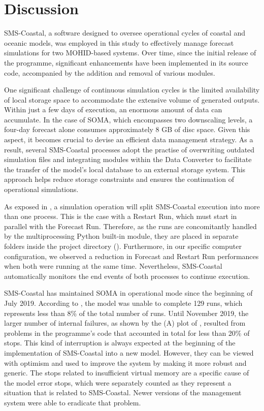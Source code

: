 \section{Discussion} \label{sec:cp4_discuss}
SMS-Coastal, a software designed to oversee operational cycles of coastal and oceanic models, was employed in this study to effectively manage forecast simulations for two MOHID-based systems. Over time, since the initial release of the programme, significant enhancements have been implemented in its source code, accompanied by the addition and removal of various modules.

One significant challenge of continuous simulation cycles is the limited availability of local storage space to accommodate the extensive volume of generated outputs. Within just a few days of execution, an enormous amount of data can accumulate. In the case of SOMA, which encompasses two downscaling levels, a four-day forecast alone consumes approximately 8 GB of disc space. Given this aspect, it becomes crucial to devise an efficient data management strategy. As a result, several SMS-Coastal processes adopt the practise of overwriting outdated simulation files and integrating modules within the Data Converter to facilitate the transfer of the model's local database to an external storage system. This approach helps reduce storage constraints and ensures the continuation of operational simulations.

As exposed in , a simulation operation will split SMS-Coastal execution into more than one process. This is the case with a Restart Run, which must start in parallel with the Forecast Run. Therefore, as the runs are concomitantly handled by the multiprocessing Python built-in module, they are placed in separate folders inside the project directory (). Furthermore, in our specific computer configuration, we observed a reduction in Forecast and Restart Run performances when both were running at the same time. Nevertheless, SMS-Coastal automatically monitors the end events of both processes to continue execution.

SMS-Coastal has maintained SOMA in operational mode since the beginning of July 2019. According to , the model was unable to complete 129 runs, which represents less than 8\% of the total number of runs. Until November 2019, the larger number of internal failures, as shown by the (A) plot of , resulted from problems in the programme's code that accounted in total for less than 20\% of stops. This kind of interruption is always expected at the beginning of the implementation of SMS-Coastal into a new model. However, they can be viewed with optimism and used to improve the system by making it more robust and generic. The stops related to insufficient virtual memory are a specific cause of the model error stops, which were separately counted as they represent a situation that is related to SMS-Coastal. Newer versions of the management system were able to eradicate that problem.

